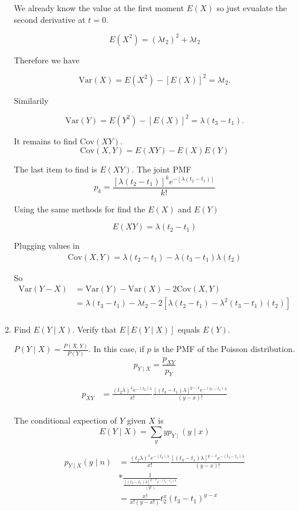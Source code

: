 \documentclass{tufte-book}
\newcommand{\Var}{\mathrm{Var}}
\newcommand{\Cov}{\mathrm{Cov}}
\theoremstyle{mytheoremstyle}
\theoremstyle{mylemstyle}
\theoremstyle{mydefstyle}
\begin{document}
\begin{enumerate}
We already know the value at the first moment $E(X)$ so just evualate the second derivative at $t=0$.

\[ E(X^2)= (\lambda t_2)^2 + \lambda t_2 \]

Therefore we have

\[ \Var(X) = E(X^2)- [E(X)]^2 = \lambda t_2. \]

Similarily

\[ \Var(Y) = E(Y^2)-[E(X)]^2 = \lambda(t_3-t_1). \]

It remains to find $\Cov(XY)$.
\[ \Cov(X,Y) = E(XY) - E(X)E(Y) \]

The last item to find is $E(XY)$.  The joint PMF
\[ p_k= \frac{[\lambda(t_2-t_1)]^ke^{-[\lambda(t_2-t_1)]}}{k!} \]

Using the same methods for find the $E(X)$ and $E(Y)$

\[ E(XY) = \lambda(t_2-t_1) \]

Plugging values in
\begin{align*}
\Cov(X,Y) = \lambda(t_2-t_1) - \lambda(t_3-t_1)\lambda(t_2)
\end{align*}

So
\begin{align*}
\Var(Y-X) &= \Var(Y) - \Var(X) - 2\Cov(X,Y)\\
&= \lambda(t_3-t_1) - \lambda t_2 - 2[\lambda(t_2-t_1) - \lambda^2(t_3-t_1)(t_2)]\\
\end{align*}

\item Find $E(Y \mid X)$. Verify that $E[E(Y\mid X)]$ equals $E(Y)$.

 $P(Y\mid X) = \frac{P(X,Y)}{P(Y)}$.  In this case, if $p$ is the PMF of the Poisson distribution.
\[p_{Y\mid X} = \frac{p_{XY}}{p_Y} \]

\begin{align*}
p_{XY} &= \frac{(t_2\lambda)^xe^{-(t_2)\lambda}}{x!}\frac{[(t_3-t_1)\lambda]^{y-x}e^{-(t_3-t_1)\lambda}}{(y-x)!}\\
\end{align*}

The conditional expection of $Y$ given $X$ is
\[ E(Y \mid X) = \sum_y yp_{Y\mid }(y\mid x) \]

\begin{align*}
p_{Y\mid X}(y\mid n)&=\frac{(t_2\lambda)^xe^{-(t_2)\lambda}}{x!}\frac{[(t_3-t_1)\lambda]^{y-x}e^{-(t_3-t_1)\lambda}}{(y-x)!}\\
&*\frac{1}{ \frac{[(t_3-t_1)\lambda]^{y-x}e^{-(t_3-t_1)\lambda}}{(y!)}}\\
&= \frac{x!}{x!(y-x!)}t_2^x(t_3-t_1)^{y-x}\\
\end{align*}


\end{enumerate}
\end{document}
